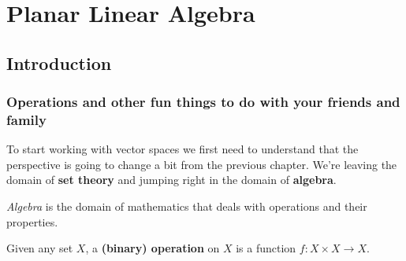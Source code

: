\chapter{Planar Linear Algebra}
\section{Introduction}
\subsection{Operations and other fun things to do with your friends and family}

To start working with vector spaces we first need to understand that the perspective is going to change a bit from the previous chapter. We're leaving the domain of \textbf{set theory} and jumping right in the domain of \textbf{algebra}.

\textit{Algebra }is the domain of mathematics that deals with operations and their properties.

\begin{df}
	Given any set $X$, a \textbf{(binary) operation} on $X$ is a function $f:X\times X \to X$.
\end{df}

